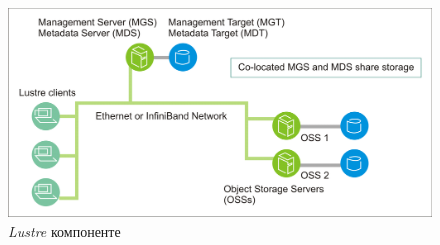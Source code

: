 \begin{figure}[h!]
  \centering
      \includegraphics[width=1\textwidth]{slike/lustre.png}
  \caption{\textit{Lustre} компоненте}
\end{figure}




